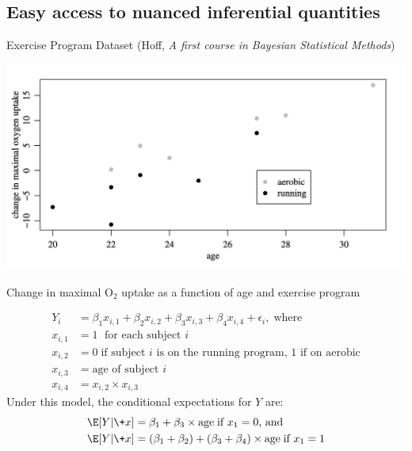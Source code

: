 \documentclass[10pt]{beamer}
\begin{document}
\subsection{Easy access to nuanced inferential quantities}

\begin{frame}{Exercise Program Dataset \hfill \tiny (Hoff, \textit{A first course in Bayesian Statistical Methods}) }
	
\begin{center}
\includegraphics[width=.5\textwidth]{images/hoff_exercise_program_data}

\scriptsize Change in maximal $\text{O}_2$ uptake as a function of age and exercise program
\end{center}

{\normalsize {}}
\scriptsize 
\begin{align*}
Y_i &= \beta_1 x_{i,1} + \beta_2 x_{i,2} + \beta_3 x_{i,3} + \beta_4 x_{i,4} + \epsilon_i, \; \text{where} \\
x_{i,1} &=1 \; \text{ for each subject $i$} \\
x_{i,2} &=0 \; \text{if subject $i$ is on the running program, 1 if on aerobic} \\
x_{i,3} &= \text{age of subject $i$} \\
x_{i,4} &= x_{i,2} \times x_{i,3}
\end{align*}
\pause 
Under this model, the conditional expectations for $Y$ are:
\begin{align*}
\E[Y|\+x] &= \beta_1 + \beta_3 \times \text{age} \; \text{if $x_1 =0$, and} \\
\E[Y|\+x] &= (\beta_1 + \beta_2) + (\beta_3 + \beta_4) \times \text{age} \; \text{if $x_1 =1$} 
\end{align*}
\end{frame}
\end{document}

